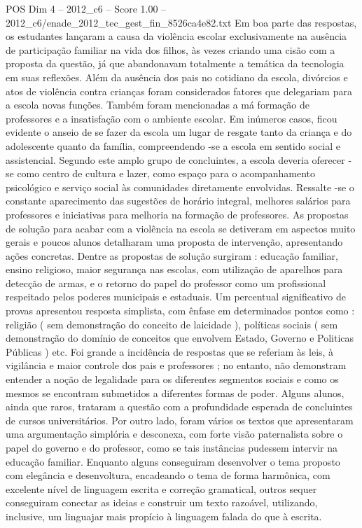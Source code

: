 \begin{textsample}{POS Dim 4 – 2012\_c6 – Score 1.00 – 2012\_c6/enade\_2012\_tec\_gest\_fin\_8526ca4e82.txt}
Em boa parte das respostas, os estudantes lançaram a causa da violência escolar exclusivamente na ausência de participação familiar na vida dos filhos, às vezes criando uma cisão com a proposta da questão, já que abandonavam totalmente a temática da tecnologia em suas reflexões.
Além da ausência dos pais no cotidiano da escola, divórcios e atos de violência contra crianças foram considerados fatores que delegariam para a escola novas funções.
Também foram mencionadas a má formação de professores e a insatisfação com o ambiente escolar.
Em inúmeros casos, ficou evidente o anseio de se fazer da escola um lugar de resgate tanto da criança e do adolescente quanto da família, compreendendo -se a escola em sentido social e assistencial.
Segundo este amplo grupo de concluintes, a escola deveria oferecer -se como centro de cultura e lazer, como espaço para o acompanhamento psicológico e serviço social às comunidades diretamente envolvidas.
Ressalte -se o constante aparecimento das sugestões de horário integral, melhores salários para professores e iniciativas para melhoria na formação de professores.
As propostas de solução para acabar com a violência na escola se detiveram em aspectos muito gerais e poucos alunos detalharam uma proposta de intervenção, apresentando ações concretas.
Dentre as propostas de solução surgiram : educação familiar, ensino religioso, maior segurança nas escolas, com utilização de aparelhos para detecção de armas, e o retorno do papel do professor como um profissional respeitado pelos poderes municipais e estaduais.
Um percentual significativo de provas apresentou resposta simplista, com ênfase em determinados pontos como : religião ( sem demonstração do conceito de laicidade ), políticas sociais ( sem demonstração do domínio de conceitos que envolvem Estado, Governo e Politicas Públicas ) etc.
Foi grande a incidência de respostas que se referiam às leis, à vigilância e maior controle dos pais e professores ; no entanto, não demonstram entender a noção de legalidade para os diferentes segmentos sociais e como os mesmos se encontram submetidos a diferentes formas de poder.
Alguns alunos, ainda que raros, trataram a questão com a profundidade esperada de concluintes de cursos universitários.
Por outro lado, foram vários os textos que apresentaram uma argumentação simplória e desconexa, com forte visão paternalista sobre o papel do governo e do professor, como se tais instâncias pudessem intervir na educação familiar.
Enquanto alguns conseguiram desenvolver o tema proposto com elegância e desenvoltura, encadeando o tema de forma harmônica, com excelente nível de linguagem escrita e correção gramatical, outros sequer conseguiram conectar as ideias e construir um texto razoável, utilizando, inclusive, um linguajar mais propício à linguagem falada do que à escrita.

\end{textsample}
